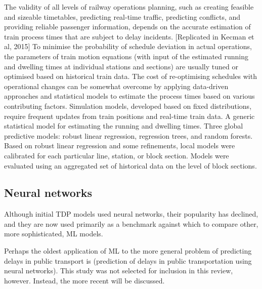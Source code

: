 \documentclass{article}
\begin{document}
The validity of all levels of railway operations planning, such as creating feasible and sizeable timetables, predicting real-time traffic, predicting conflicts, and providing reliable passenger information, depends on the accurate estimation of train process times that are subject to delay incidents. [Replicated in Kecman et al, 2015]
To minimise the probability of schedule deviation in actual operations, the parameters of train motion equations (with input of the estimated running and dwelling times at individual stations and sections) are usually tuned or optimised based on historical train data.
The cost of re-optimising schedules with operational changes can be somewhat overcome by applying data-driven approaches and statistical models to estimate the process times based on various contributing factors.
Simulation models, developed based on fixed distributions, require frequent updates from train positions and real-time train data. 
A generic statistical model for estimating the running and dwelling times. Three global predictive models: robust linear regression, regression trees, and random forests. Based on robust linear regression and some refinements, local models were calibrated for each particular line, station, or block section. Models were evaluated using an aggregated set of historical data on the level of block sections. 


\subsection{Neural networks}

Although initial TDP models used neural networks, their popularity has declined, and they are now used primarily as a benchmark against which to compare other, more sophisticated, ML models.

Perhaps the oldest application of ML to the more general problem of predicting delays in public transport is \cite{peters_et_al_2005} (prediction of delays in public transportation using neural networks). This study was not selected for inclusion in this review, however. Instead, the more recent \cite{yaghini_et_al_2013} will be discussed.
\end{document}
